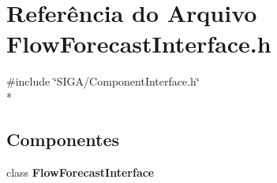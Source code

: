 \section{Referência do Arquivo Flow\+Forecast\+Interface.\+h}
\label{_flow_forecast_interface_8h}
{\ttfamily \#include \char`\"{}S\+I\+G\+A/\+Component\+Interface.\+h\char`\"{}}\\*
\subsection*{Componentes}
\begin{DoxyCompactItemize}
\item 
class {\bf Flow\+Forecast\+Interface}
\end{DoxyCompactItemize}
